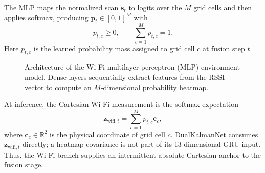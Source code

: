 \documentclass[conference]{IEEEtran}
\begin{document}
The MLP maps the normalized scan $\tilde{\mathbf{s}}_t$ to logits over the $M$ grid cells and then applies softmax, producing $\mathbf{p}_t\in[0,1]^M$ with
\begin{equation}
p_{t,c}\ge 0,\qquad \sum_{c=1}^{M}p_{t,c}=1.
\label{eq:softmax_def}
\end{equation}
Here $p_{t,c}$ is the learned probability mass assigned to grid cell $c$ at fusion step $t$.
\begin{figure}[htbp]
\centering
{}
\caption{Architecture of the Wi-Fi multilayer perceptron (MLP) environment model. Dense layers sequentially extract features from the RSSI vector to compute an $M$-dimensional probability heatmap.}
\label{fig:mlp_arch}
\end{figure}

At inference, the Cartesian Wi-Fi measurement is the softmax expectation
\begin{equation}
\mathbf{z}_{\mathrm{wifi},t}=\sum_{c=1}^{M}p_{t,c}\mathbf{c}_c,
\label{eq:heatmap_centroid}
\end{equation}
where $\mathbf{c}_c\in\mathbb{R}^2$ is the physical coordinate of grid cell $c$. DualKalmanNet consumes $\mathbf{z}_{\mathrm{wifi},t}$ directly; a heatmap covariance is not part of its 13-dimensional GRU input. Thus, the Wi-Fi branch supplies an intermittent absolute Cartesian anchor to the fusion stage.
\end{document}
